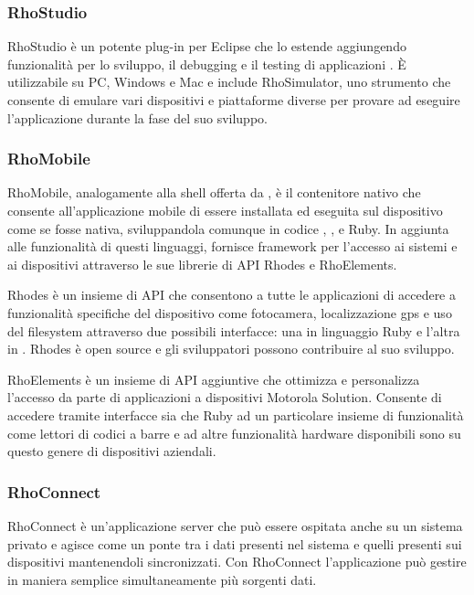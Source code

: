             \subsubsection{RhoStudio}
                RhoStudio è un potente plug-in per Eclipse che lo estende aggiungendo
                funzionalità per lo sviluppo, il debugging e il testing di
                applicazioni \rhom{}. È utilizzabile su PC, Windows e Mac e
                include RhoSimulator, uno strumento che consente di emulare
                vari dispositivi e piattaforme diverse per provare ad eseguire
                l'applicazione durante la fase del suo sviluppo.
            \subsubsection{RhoMobile}
                RhoMobile, analogamente alla shell offerta da \pg{}, è il contenitore
                nativo che consente all'applicazione mobile di essere installata ed
                eseguita sul dispositivo come se fosse nativa, sviluppandola
                comunque in codice \html{}, \css{}, \js{} e Ruby. In aggiunta
                alle funzionalità di questi linguaggi, \rhom{} fornisce
                frame\-work per l'accesso ai sistemi e ai dispositivi attraverso
                le sue librerie di API Rhodes e RhoElements.

                Rhodes è un insieme di API che consentono a tutte le applicazioni
                \rhom{} di accedere a funzionalità specifiche del dispositivo
                come fotocamera, localizzazione gps e uso del filesys\-tem attraverso
                due possibili interfacce: una in linguaggio Ruby e l'altra in
                \js{}. Rhodes è open \mbox{source} e gli sviluppatori possono
                contribuire al suo sviluppo.

                RhoElements è un insieme di API aggiuntive che ottimizza e personalizza
                l'accesso da parte di applicazioni \rhom{} a dispositivi
                Motorola Solution. Consente di accedere tramite interfacce
                sia \js{} che Ruby ad un particolare insieme di funzionalità
                come lettori di codici a barre e ad altre funzionalità
                hardware disponibili sono su questo genere di dispositivi
                aziendali.
            \subsubsection{RhoConnect}
                RhoConnect è un'applicazione server che può essere ospitata anche
                su un sistema privato e agisce come un ponte tra i dati presenti
                nel sistema e quelli presenti sui dispositivi mantenendoli sincronizzati.
                Con RhoConnect l'applicazione può gestire in maniera semplice
                simultaneamente più sorgenti dati.
